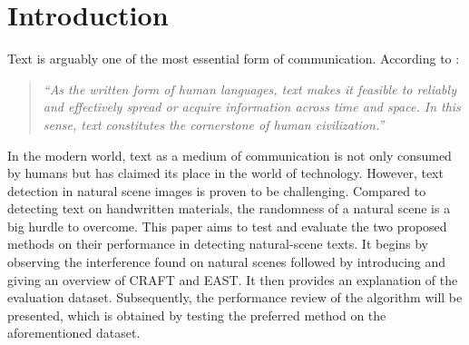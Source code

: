 \documentclass[10pt, a4paper]{article}
\begin{document}
\section{Introduction} %
\label{sec:introduction}
Text is arguably one of the most essential form of communication. According to \cite{LongEtAl}: 
\begin{quotation}
	\emph{``As the written form of human languages, text makes it feasible to reliably and effectively spread or acquire information across time and space. In this sense, text constitutes the cornerstone of human civilization.''} 
	\citep{LongEtAl} 
\end{quotation}
In the modern world, text as a medium of communication is not only consumed by humans but has claimed its place in the world of technology.
However, text detection in natural scene images is proven to be challenging. Compared to detecting text on handwritten materials, the randomness of a natural scene is a big hurdle to overcome.
This paper aims to test and evaluate the two proposed methods on their performance in detecting natural-scene texts. It begins by observing the interference found on natural scenes followed by introducing and giving an overview of CRAFT and EAST.
It then provides an explanation of the evaluation dataset. Subsequently, the performance review of the algorithm will be presented, which is obtained by testing the preferred method on the aforementioned dataset.
\end{document}
